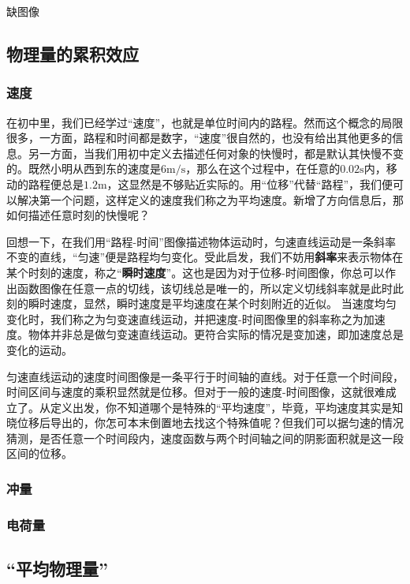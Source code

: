 
\begin{issues}
\issueTODO 缺图像
\end{issues}

\subsection{物理量的累积效应}

\subsubsection{速度}
在初中里，我们已经学过“速度”，也就是单位时间内的路程。然而这个概念的局限很多，一方面，路程和时间都是数字，“速度”很自然的，也没有给出其他更多的信息。另一方面，当我们用初中定义去描述任何对象的快慢时，都是默认其快慢不变的。既然小明从西到东的速度是$6 \mathrm{m/s}$，那么在这个过程中，在任意的$0.02\mathrm s$内，移动的路程便总是$1.2\mathrm m$，这显然是不够贴近实际的。用“位移”代替“路程”，我们便可以解决第一个问题，这样定义的速度我们称之为平均速度。新增了方向信息后，那如何描述任意时刻的快慢呢？

回想一下，在我们用“路程-时间”图像描述物体运动时，匀速直线运动是一条斜率不变的直线，“匀速”便是路程均匀变化。受此启发，我们不妨用\textbf{斜率}来表示物体在某个时刻的速度，称之“\textbf{瞬时速度}”。这也是因为对于位移-时间图像，你总可以作出函数图像在任意一点的切线，该切线总是唯一的，所以定义切线斜率就是此时此刻的瞬时速度，显然，瞬时速度是平均速度在某个时刻附近的近似。
当速度均匀变化时，我们称之为匀变速直线运动，并把速度-时间图像里的斜率称之为加速度。物体并非总是做匀变速直线运动。更符合实际的情况是变加速，即加速度总是变化的运动。

匀速直线运动的速度时间图像是一条平行于时间轴的直线。对于任意一个时间段，时间区间与速度的乘积显然就是位移。但对于一般的速度-时间图像，这就很难成立了。从定义出发，你不知道哪个是特殊的“平均速度”，毕竟，平均速度其实是知晓位移后导出的，你怎可本末倒置地去找这个特殊值呢？但我们可以据匀速的情况猜测，是否任意一个时间段内，速度函数与两个时间轴之间的阴影面积就是这一段区间的位移。


\subsubsection{冲量}
\subsubsection{电荷量}
\subsection{“平均物理量”}